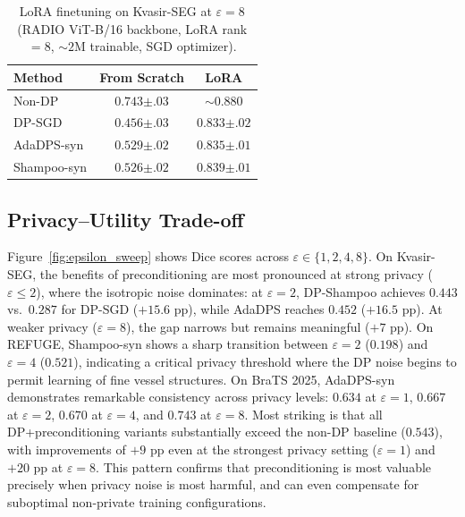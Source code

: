\documentclass[runningheads]{llncs}
\begin{document}
\begin{table}[t]
\centering
\caption{LoRA finetuning on Kvasir-SEG at $\varepsilon{=}8$ (RADIO ViT-B/16 backbone, LoRA rank$=8$, ${\sim}2$M trainable, SGD optimizer).}\label{tab:lora}
\renewcommand{\arraystretch}{1.15}
\small
\begin{tabular}{lcc}
\toprule
\textbf{Method} & \textbf{From Scratch} & \textbf{LoRA} \\
\midrule
Non-DP & $0.743{\scriptstyle\pm.03}$ & ${\sim}0.880$ \\
\midrule
DP-SGD & $0.456{\scriptstyle\pm.03}$ & $0.833{\scriptstyle\pm.02}$ \\
AdaDPS-syn & $\mathbf{0.529}{\scriptstyle\pm.02}$ & $0.835{\scriptstyle\pm.01}$ \\
Shampoo-syn & $0.526{\scriptstyle\pm.02}$ & $\mathbf{0.839}{\scriptstyle\pm.01}$ \\
\bottomrule
\end{tabular}
\end{table}

\subsection{Privacy--Utility Trade-off}
\label{subsec:epsilon_sweep}

Figure~\ref{fig:epsilon_sweep} shows Dice scores across $\varepsilon\in\{1,2,4,8\}$. On Kvasir-SEG, the benefits of preconditioning are most pronounced at strong privacy ($\varepsilon{\leq}2$), where the isotropic noise dominates: at $\varepsilon{=}2$, DP-Shampoo achieves $0.443$ vs.\ $0.287$ for DP-SGD ($+15.6$ pp), while AdaDPS reaches $0.452$ ($+16.5$ pp). At weaker privacy ($\varepsilon{=}8$), the gap narrows but remains meaningful ($+7$ pp). On REFUGE, Shampoo-syn shows a sharp transition between $\varepsilon{=}2$ ($0.198$) and $\varepsilon{=}4$ ($0.521$), indicating a critical privacy threshold where the DP noise begins to permit learning of fine vessel structures. On BraTS 2025, AdaDPS-syn demonstrates remarkable consistency across privacy levels: $0.634$ at $\varepsilon{=}1$, $0.667$ at $\varepsilon{=}2$, $0.670$ at $\varepsilon{=}4$, and $0.743$ at $\varepsilon{=}8$. Most striking is that all DP+preconditioning variants substantially exceed the non-DP baseline ($0.543$), with improvements of $+9$ pp even at the strongest privacy setting ($\varepsilon{=}1$) and $+20$ pp at $\varepsilon{=}8$. This pattern confirms that preconditioning is most valuable precisely when privacy noise is most harmful, and can even compensate for suboptimal non-private training configurations.
\end{document}
